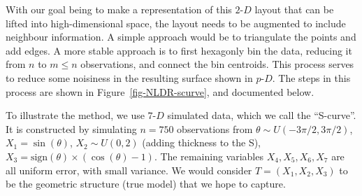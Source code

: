 \documentclass[
  12pt]{article}
\newcommand\pD{$p\text{-}D$}
\newcommand\gD{$2\text{-}D$}
\begin{document}
With our goal being to make a representation of this \gD{} layout that
can be lifted into high-dimensional space, the layout needs to be
augmented to include neighbour information. A simple approach would be
to triangulate the points and add edges. A more stable approach is to
first hexagonly bin the data, reducing it from \(n\) to \(m\leq n\)
observations, and connect the bin centroids. This process serves to
reduce some noisiness in the resulting surface shown in \pD{}. The steps
in this process are shown in Figure~\ref{fig-NLDR-scurve}, and
documented below.

To illustrate the method, we use \(7\text{-}D\) simulated data, which we
call the ``S-curve''. It is constructed by simulating \(n=750\)
observations from \(\theta \sim U(-3\pi/2, 3\pi/2)\),
\(X_1 = \sin(\theta)\), \(X_2 \sim U(0, 2)\) (adding thickness to the
S), \(X_3 = \text{sign}(\theta) \times (\cos(\theta) - 1)\). The
remaining variables \(X_4, X_5, X_6, X_7\) are all uniform error, with
small variance. We would consider \(T=(X_1, X_2, X_3)\) to be the
geometric structure (true model) that we hope to capture.
\end{document}
